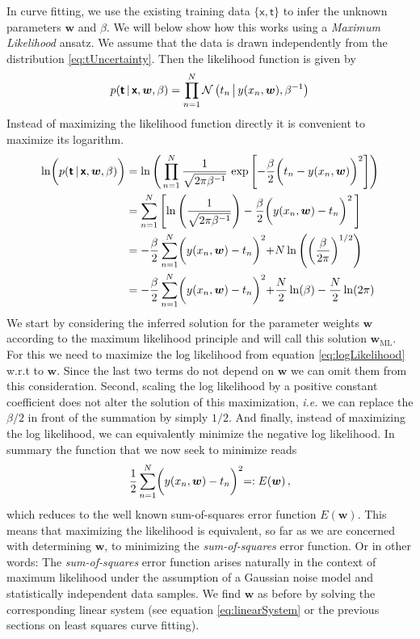 \documentclass[11pt, DINA4, fleqn]{amsart}
\begin{document}
In curve fitting, we use the existing training data $\{\boldsymbol{\mathsf{x}}, \boldsymbol{\mathsf{t}}\}$ to infer the unknown parameters $\bm{w}$ and $\beta$.
We will below show how this works using a \emph{Maximum Likelihood} ansatz.
We assume that the data is drawn independently from the distribution \eqref{eq:tUncertainty}. Then the likelihood function is given by
\begin{align}
p(\boldsymbol{\mathsf{t}} \, | \, \boldsymbol{\mathsf{x}}, \bm{w}, \beta) = 
\prod\displaylimits_{n = 1}^{N}
\mathcal{N}\left(
t_n \, \bigl| \, y(x_n,\bm{w}), \beta^{-1}\right)
\label{eq:likelihoodFunc}
\end{align}
Instead of maximizing the likelihood function directly it is convenient to maximize its logarithm.
\begin{align}
\ln\biggl(p(\boldsymbol{\mathsf{t}} \, | \, \boldsymbol{\mathsf{x}}, \bm{w}, \beta)\biggl) &= \ln\left(\,
\prod\displaylimits_{n=1}^{N} \dfrac{1}{\sqrt{2\pi \beta^{-1}}} \, \exp\left[
-\dfrac{\beta}{2}\biggl(t_n - y(x_n,\bm{w})\biggl)^2
\right]
\right) \\
&=
\sum\displaylimits_{n=1}^{N}
\left[
\ln\left(\dfrac{1}{\sqrt{2\pi \beta^{-1}}}\right) -
\dfrac{\beta}{2}\biggl(y(x_n, \bm{w}) - t_n\biggl)^2 \,
\right] \\
&=
-\dfrac{\beta}{2}\sum\displaylimits_{n=1}^{N} \biggl(y(x_n, \bm{w}) - t_n\biggl)^2 +
N \ln\left(\left(\dfrac{\beta}{2\pi}\right)^{1/2}\right) \\
&= 
-\dfrac{\beta}{2}\sum\displaylimits_{n=1}^{N} \biggl(y(x_n, \bm{w}) - t_n\biggl)^2 +
\dfrac{N}{2}\ln(\beta)
- \dfrac{N}{2}\ln(2\pi)
\label{eq:logLikelihood}
\end{align}
We start by considering the inferred solution for the parameter weights $\bm{w}$ according to the maximum likelihood principle and will call this solution $\bm{w}_{\text{ML}}$. For this we need to maximize the log likelihood from equation \eqref{eq:logLikelihood} w.r.t to $\bm{w}$.
Since the last two terms do not depend on $\bm{w}$ we can omit them from this consideration. Second, scaling the log likelihood by a positive constant coefficient does not alter the solution of this maximization, \textit{i.e.} we can replace the $\beta/ 2$ in front of the summation by simply $1/2$. And finally, instead of maximizing the log likelihood, we can equivalently minimize the negative log likelihood. In summary the function that we now seek to minimize reads
\begin{align}
\dfrac{1}{2} \sum\displaylimits_{n=1}^{N} \biggl(y(x_n, \bm{w}) - t_n\biggl)^2 =: E(\bm{w}) \, ,
\end{align}
which reduces to the well known sum-of-squares error function $E(\bm{w})$.
This means that maximizing the likelihood is equivalent, so far as we are concerned with determining $\bm{w}$, to minimizing the \emph{sum-of-squares} error function.
Or in other words: The \emph{sum-of-squares} error function arises naturally in the context of maximum likelihood under the assumption of a Gaussian noise model and statistically independent data samples. We find $\bm{w}$ as before by solving the corresponding linear system (see equation \eqref{eq:linearSystem} or the previous sections on least squares curve fitting).
\end{document}
